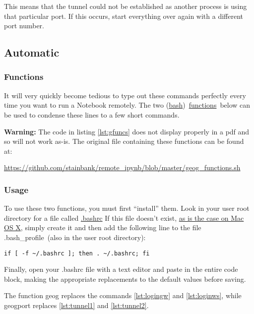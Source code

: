 \documentclass[a4paper]{article}
\begin{document}
This means that the tunnel could not be established as another process is using that particular port. If this occurs, start everything over again with a different port number.

\subsection{Automatic}
\label{sec:auto}

\subsubsection{Functions}
It will very quickly become tedious to type out these commands perfectly every time you want to run a Notebook remotely.
The two (\href{http://cs.lmu.edu/~ray/notes/bash/}{bash})~\href{https://www.shellscript.sh/functions.html}{functions}~below can be used to condense these lines to a few short commands.



\textbf{Warning:} The code in listing \ref{lst:gfuncs} does not display properly in a pdf and so will not work as-is. The original file containing these functions can be found at:

\url{https://github.com/stainbank/remote_ipynb/blob/master/geog_functions.sh}

\subsubsection{Usage}

To use these two functions, you must first ``install'' them. Look in your user root directory for a file called \href{http://superuser.com/questions/49289/what-is-the-bashrc-file}{.bashrc}
If this file doesn't exist, \href{http://apple.stackexchange.com/a/119714}{as is the case on Mac OS X}, simply create it and then add the following line to the file .bash\_profile~(also in the user root directory): 

\begin{lstlisting}[caption={Source .bashrc}, label={lst:srcbashrc}]
if [ -f ~/.bashrc ]; then . ~/.bashrc; fi
\end{lstlisting}

Finally, open your .bashrc file with a text editor and paste in the entire code block, making the appropriate replacements to the default values before saving.

The function geog replaces the commands \ref{lst:logingw} and \ref{lst:loginws}, while geogport replaces \ref{lst:tunnel1} and \ref{lst:tunnel2}.
\end{document}
